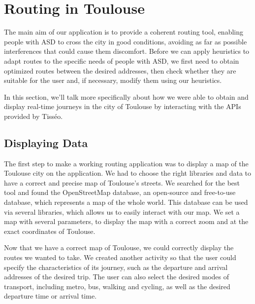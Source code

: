 
\section{Routing in Toulouse}

The main aim of our application is to provide a coherent routing tool, enabling people with ASD to cross the city in good conditions, avoiding as far as possible interferences that could cause them discomfort. Before we can apply heuristics to adapt routes to the specific needs of people with ASD, we first need to obtain optimized routes between the desired addresses, then check whether they are suitable for the user and, if necessary, modify them using our heuristics.\newline

In this section, we'll talk more specifically about how we were able to obtain and display real-time journeys in the city of Toulouse by interacting with the APIs provided by Tisséo.\newline

\subsection{Displaying Data}
The first step to make a working routing application was to display a map of the Toulouse city on the application. We had to choose the right libraries and data to have a correct and precise map of Toulouse's streets. We searched for the best tool and found the OpenStreetMap database, an open-source and free-to-use database, which represents a map of the whole world. This database can be used via several libraries, which allows us to easily interact with our map. We set a map with several parameters, to display the map with a correct zoom and at the exact coordinates of Toulouse.\newline


Now that we have a correct map of Toulouse, we could correctly display the routes we wanted to take. We created another activity so that the user could specify the characteristics of its journey, such as the departure and arrival addresses of the desired trip. The user can also select the desired modes of transport, including metro, bus, walking and cycling, as well as the desired departure time or arrival time.\newline

